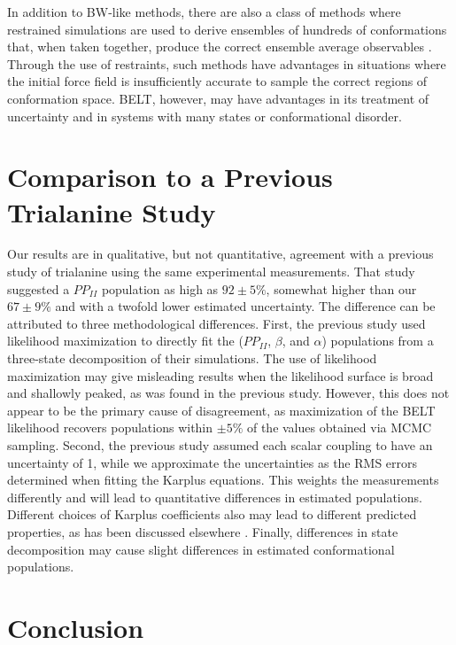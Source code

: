 \documentclass[journal=jacsat,manuscript=article]{achemso}
\begin{document}
In addition to BW-like methods, there are also a class of methods where restrained simulations are used to derive ensembles of hundreds of conformations that, when taken together, produce the correct ensemble average observables \cite{richter2007mumo, lindorff2005simultaneous}.  Through the use of restraints, such methods have advantages in situations where the initial force field is insufficiently accurate to sample the correct regions of conformation space.  BELT, however, may have advantages in its treatment of uncertainty and in systems with many states or conformational disorder.

\section*{Comparison to a Previous Trialanine Study}

Our results are in qualitative, but not quantitative, agreement with a previous study of trialanine \cite{Graf2007} using the same experimental measurements.  That study suggested a $PP_{II}$ population as high as $92 \pm 5\%$, somewhat higher than our $67 \pm 9 \%$ and with a twofold lower estimated uncertainty.  The difference can be attributed to three methodological differences.  First, the previous study used likelihood maximization to directly fit the ($PP_{II}$, $\beta$, and $\alpha$) populations from a three-state decomposition of their simulations.  The use of likelihood maximization may give misleading results when the likelihood surface is broad and shallowly peaked, as was found in the previous study.  However, this does not appear to be the primary cause of disagreement, as maximization of the BELT likelihood recovers populations within $\pm 5\%$ of the values obtained via MCMC sampling.  Second, the previous study assumed each scalar coupling to have an uncertainty of 1, while we approximate 
the uncertainties as the RMS errors 
determined when fitting the Karplus equations.  This weights the measurements differently and will lead to quantitative differences in estimated populations.  Different choices of Karplus coefficients also may lead to different predicted properties, as has been discussed elsewhere \cite{markwick2009structural}.    Finally, differences in state decomposition may cause slight differences in estimated conformational populations.  



\section*{Conclusion}
\end{document}
